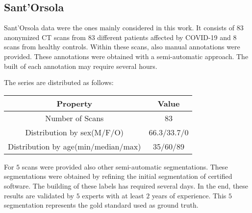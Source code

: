 \documentclass{standalone}
\begin{document}
	\subsection{Sant'Orsola}
	


	Sant'Orsola data were the ones mainly considered in this work. It consists of 83 anonymized CT scans from $83$ different patients affected by COVID-19 and $8$ scans from healthy controls. 
	Within these scans, also manual annotations were provided. These annotations were obtained with a semi-automatic approach. The built of each annotation may require several hours.
	
		The series are distributed as follows: 
	\begin{table}[h!]
		\centering
		\begin{tabular}{|c|c|}
			\hline
			\textbf{Property}   		&	\textbf{Value} \\ \hline
			Number of Scans 			& 83			   \\ 
			Distribution by sex(M/F/O)  		& 66.3/33.7/0    \\
			Distribution by age(min/median/max) & 35/60/89	\\ \hline
		\end{tabular}
	\end{table}
	
	
	For $5$ scans were provided also other semi-automatic segmentations. These segmentations were obtained by refining the initial segmentation of certified software. The building of these labels has required several days. In the end, these results are validated by $5$ experts with at least $2$ years of experience. This $ 5$ segmentation represents the gold standard used as ground truth.

	
\end{document}
